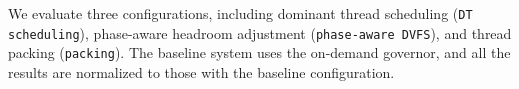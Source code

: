 We evaluate three configurations, including dominant thread scheduling ({\tt DT scheduling}), 
phase-aware headroom adjustment ({\tt phase-aware DVFS}), and thread packing ({\tt packing}). The baseline system uses
the on-demand governor, and all the results are normalized to those with the baseline configuration. 


